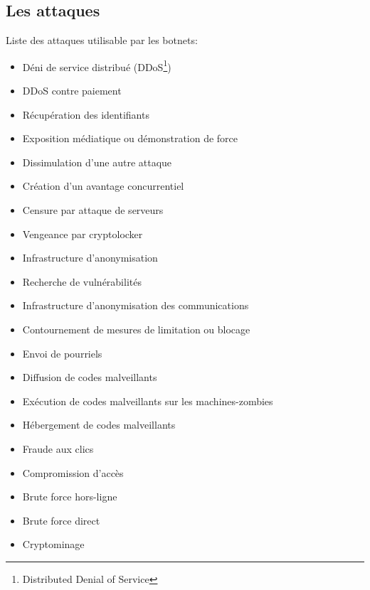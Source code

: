 \subsection{Les attaques}
Liste des attaques utilisable par les botnets:
\begin{itemize}
	\item Déni de service distribué (DDoS\footnote{Distributed Denial of Service}) 
	\item DDoS contre paiement 
	\item Récupération des identifiants
	\item Exposition médiatique ou démonstration de force 
	\item Dissimulation d’une autre attaque
	\item Création d’un avantage concurrentiel 
	\item Censure par attaque de serveurs
	\item Vengeance par cryptolocker
	\item Infrastructure d’anonymisation 
	\item Recherche de vulnérabilités
	\item Infrastructure d’anonymisation des communications
	\item Contournement de mesures de limitation ou blocage 
	\item Envoi de pourriels 
	\item Diffusion de codes malveillants
	\item Exécution de codes malveillants sur les machines-zombies
	\item Hébergement de codes malveillants 
	\item Fraude aux clics 
	\item Compromission d’accès 
	\item Brute force hors-ligne
	\item Brute force direct 
	\item Cryptominage 
\end{itemize}